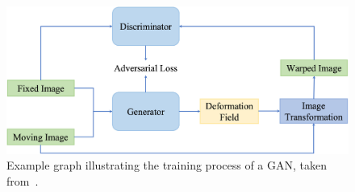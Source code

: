 \documentclass[english,version-2022-01]{uzl-thesis} %
\begin{document}
\begin{figure}[h] %
	\centering
	\graphicspath{{images/}{\main/images/}}
	\includegraphics[width=\linewidth]{GANRegistrationGraph.jpg} 
	\caption{Example graph illustrating the training process of a GAN, taken from~\cite{Zou2022}.}
	\label{fig:GANRegistration}
\end{figure}
\end{document}
